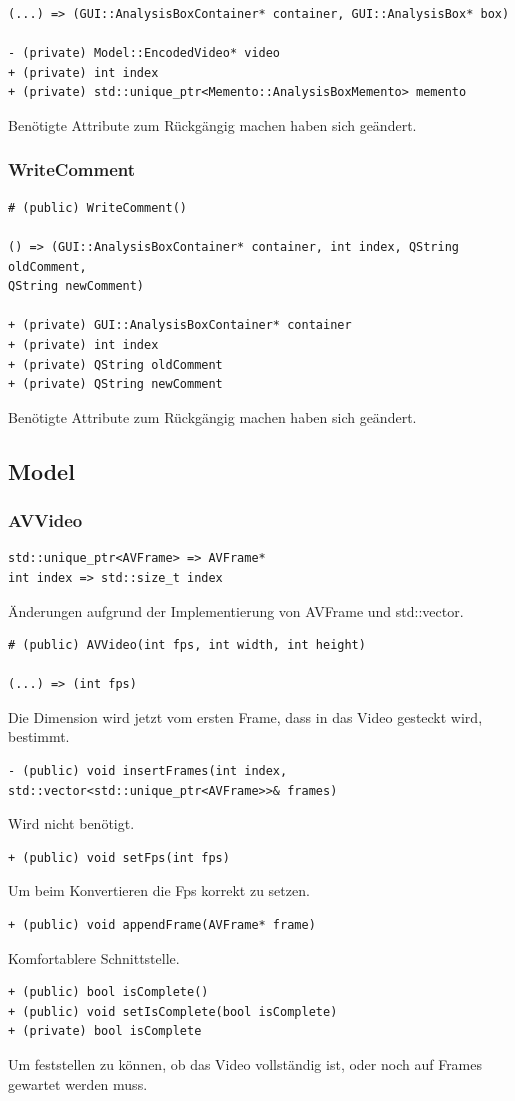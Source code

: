 \documentclass{scrartcl}
\begin{document}
{\begin{verbatim}
(...) => (GUI::AnalysisBoxContainer* container, GUI::AnalysisBox* box)

- (private) Model::EncodedVideo* video
+ (private) int index
+ (private) std::unique_ptr<Memento::AnalysisBoxMemento> memento
\end{verbatim}
Benötigte Attribute zum Rückgängig machen haben sich geändert.
\newpage
\subsubsection{WriteComment}
\begin{verbatim}
# (public) WriteComment()

() => (GUI::AnalysisBoxContainer* container, int index, QString oldComment,
QString newComment)

+ (private) GUI::AnalysisBoxContainer* container
+ (private) int index
+ (private) QString oldComment
+ (private) QString newComment
\end{verbatim}
Benötigte Attribute zum Rückgängig machen haben sich geändert.
\newpage
\subsection{Model}
\subsubsection{AVVideo}
\bigskip
\begin{verbatim}
std::unique_ptr<AVFrame> => AVFrame*
int index => std::size_t index
\end{verbatim}
Änderungen aufgrund der Implementierung von AVFrame und std::vector.
\bigskip
\begin{verbatim}
# (public) AVVideo(int fps, int width, int height)

(...) => (int fps)
\end{verbatim}
Die Dimension wird jetzt vom ersten Frame, dass in das Video gesteckt wird, bestimmt.
\bigskip
\begin{verbatim}
- (public) void insertFrames(int index, std::vector<std::unique_ptr<AVFrame>>& frames)
\end{verbatim}
Wird nicht benötigt.
\bigskip
\begin{verbatim}
+ (public) void setFps(int fps)
\end{verbatim}
Um beim Konvertieren die Fps korrekt zu setzen.
\bigskip
\begin{verbatim}
+ (public) void appendFrame(AVFrame* frame)
\end{verbatim}
Komfortablere Schnittstelle.
\bigskip
\begin{verbatim}
+ (public) bool isComplete()
+ (public) void setIsComplete(bool isComplete)
+ (private) bool isComplete
\end{verbatim}
Um feststellen zu können, ob das Video vollständig ist, oder noch auf Frames gewartet werden muss.
\newpage
}
\end{document}
